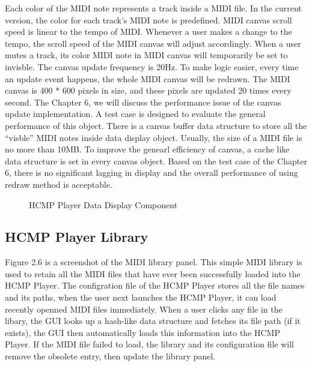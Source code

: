 Each color of the MIDI note represents a track inside 
a MIDI file. In the current version, the color for each track's MIDI note is 
predefined. MIDI canvas scroll speed is linear to the tempo of MIDI. Whenever 
a user makes a change to the tempo, the scroll speed of the MIDI canvas will adjust
accordingly. When a user mutes a
track, its color MIDI note in MIDI canvas will temporarily be set to invisble. 
The canvas
update frequency is 20Hz. To make logic easier, every time an update event 
happens, the whole MIDI canvas will be redrawn. The MIDI canvas is 400 * 600 pixels
in size, and these pixels are updated 20 times every second. The Chapter 6, we will
discuss the performance issue of the canvas update implementation. A test case is
designed to evaluate the general performance of this object. There is a canvas 
buffer data structure to store all the ``visble'' MIDI notes inside data 
display object. Usually, the size of a MIDI file is no more than 10MB. To improve
the genearl efficiency of canvas, a cache like data structure is set in 
every canvas object. Based on the test case of the Chapter 6, there is no
significant lagging in display and the overall performance of using redraw 
method is acceptable.

\begin{figure}[H]
\caption{HCMP Player Data Display Component}
\label{fig:speciation}
\end{figure}

\subsection{HCMP Player Library}

Figure 2.6 is a screenshot of the MIDI library panel. This simple MIDI library is 
used to retain all the MIDI files that have ever been successfully loaded into 
the HCMP Player. 
The configration file of the HCMP Player stores all the file names and its paths, 
when the user next launches the HCMP Player, it can load
recently openned MIDI files immediately. When a user clicks any file in the libary, 
the GUI looks up a hash-like data structure and fetches its file path 
(if it exists), the GUI then automatically
loads this information into the HCMP Player. If the MIDI file failed to load, 
the library and its configuration file will remove the obsolete entry, then 
update the library panel.

